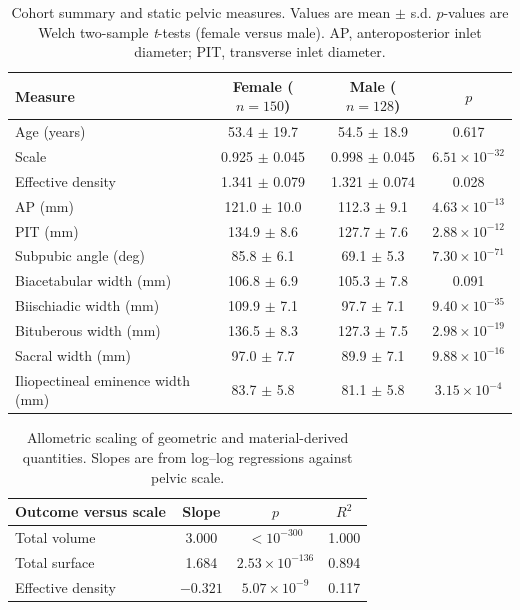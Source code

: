 \documentclass[openacc]{rsproca_new}
\begin{document}
\begin{table}[t]
\centering
\caption{Cohort summary and static pelvic measures. Values are mean $\pm$ s.d. $p$-values are Welch two-sample \emph{t}-tests (female versus male). AP, anteroposterior inlet diameter; PIT, transverse inlet diameter.}
\label{tab:cohort}
\begin{tabular}{lccc}
\toprule
Measure & Female ($n=150$) & Male ($n=128$) & $p$ \\
\midrule
Age (years) & 53.4 $\pm$ 19.7 & 54.5 $\pm$ 18.9 & 0.617 \\
Scale & 0.925 $\pm$ 0.045 & 0.998 $\pm$ 0.045 & $6.51 \times 10^{-32}$ \\
Effective density & 1.341 $\pm$ 0.079 & 1.321 $\pm$ 0.074 & 0.028 \\
AP (mm) & 121.0 $\pm$ 10.0 & 112.3 $\pm$ 9.1 & $4.63 \times 10^{-13}$ \\
PIT (mm) & 134.9 $\pm$ 8.6 & 127.7 $\pm$ 7.6 & $2.88 \times 10^{-12}$ \\
Subpubic angle (deg) & 85.8 $\pm$ 6.1 & 69.1 $\pm$ 5.3 & $7.30 \times 10^{-71}$ \\
Biacetabular width (mm) & 106.8 $\pm$ 6.9 & 105.3 $\pm$ 7.8 & 0.091 \\
Biischiadic width (mm) & 109.9 $\pm$ 7.1 & 97.7 $\pm$ 7.1 & $9.40 \times 10^{-35}$ \\
Bituberous width (mm) & 136.5 $\pm$ 8.3 & 127.3 $\pm$ 7.5 & $2.98 \times 10^{-19}$ \\
Sacral width (mm) & 97.0 $\pm$ 7.7 & 89.9 $\pm$ 7.1 & $9.88 \times 10^{-16}$ \\
Iliopectineal eminence width (mm) & 83.7 $\pm$ 5.8 & 81.1 $\pm$ 5.8 & $3.15 \times 10^{-4}$ \\
\bottomrule
\end{tabular}
\end{table}

\begin{table}[t]
\centering
\caption{Allometric scaling of geometric and material-derived quantities. Slopes are from log--log regressions against pelvic scale.}
\label{tab:allometry}
\begin{tabular}{lccc}
\toprule
Outcome versus scale & Slope & $p$ & $R^2$ \\
\midrule
Total volume & 3.000 & $< 10^{-300}$ & 1.000 \\
Total surface & 1.684 & $2.53 \times 10^{-136}$ & 0.894 \\
Effective density & $-0.321$ & $5.07 \times 10^{-9}$ & 0.117 \\
\bottomrule
\end{tabular}
\end{table}
\end{document}
